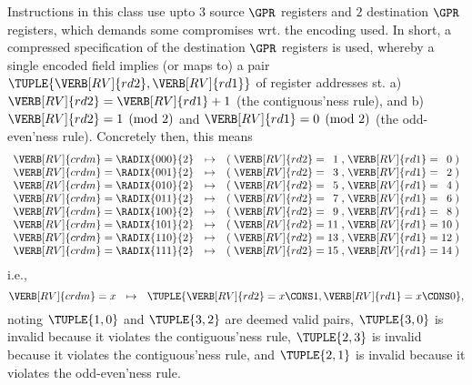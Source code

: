 Instructions in this class use upto
$3$ source      $\GPR$ registers
and
$2$ destination $\GPR$ registers,
which demands some compromises wrt. the encoding used.
In short, a compressed specification of the destination $\GPR$ registers is
used, whereby a single encoded  field implies (or maps to) a 
pair 
$
\TUPLE{ \VERB[RV]{rd2}, \VERB[RV]{rd1} }
$
of register addresses st.
a) $\VERB[RV]{rd2} = \VERB[RV]{rd1} + 1$
   (the contiguous'ness rule),
   and
b) $\VERB[RV]{rd2} = 1 \pmod{2}$
   and 
   $\VERB[RV]{rd1} = 0 \pmod{2}$
   (the  odd-even'ness rule).
Concretely then, this means
\[
\begin{array}{l@{\;}c@{\;}r c c@{\;}l@{\;}c@{\;}r@{\;}c@{\;}l@{\;}c@{\;}r@{\;}c}
\VERB[RV]{crdm} &=& \RADIX{000}{2} &\mapsto& ( & \VERB[RV]{rd2} &=&  1 &,& \VERB[RV]{rd1} &=&  0 & ) \\
\VERB[RV]{crdm} &=& \RADIX{001}{2} &\mapsto& ( & \VERB[RV]{rd2} &=&  3 &,& \VERB[RV]{rd1} &=&  2 & ) \\
\VERB[RV]{crdm} &=& \RADIX{010}{2} &\mapsto& ( & \VERB[RV]{rd2} &=&  5 &,& \VERB[RV]{rd1} &=&  4 & ) \\
\VERB[RV]{crdm} &=& \RADIX{011}{2} &\mapsto& ( & \VERB[RV]{rd2} &=&  7 &,& \VERB[RV]{rd1} &=&  6 & ) \\
\VERB[RV]{crdm} &=& \RADIX{100}{2} &\mapsto& ( & \VERB[RV]{rd2} &=&  9 &,& \VERB[RV]{rd1} &=&  8 & ) \\
\VERB[RV]{crdm} &=& \RADIX{101}{2} &\mapsto& ( & \VERB[RV]{rd2} &=& 11 &,& \VERB[RV]{rd1} &=& 10 & ) \\
\VERB[RV]{crdm} &=& \RADIX{110}{2} &\mapsto& ( & \VERB[RV]{rd2} &=& 13 &,& \VERB[RV]{rd1} &=& 12 & ) \\
\VERB[RV]{crdm} &=& \RADIX{111}{2} &\mapsto& ( & \VERB[RV]{rd2} &=& 15 &,& \VERB[RV]{rd1} &=& 14 & ) \\
\end{array}
\]
i.e.,
\[
\VERB[RV]{crdm} = x ~~\mapsto~~ \TUPLE{ \VERB[RV]{rd2} = x \CONS 1 , \VERB[RV]{rd1} = x \CONS 0 } ,
\]
noting
$\TUPLE{ 1, 0 }$ and $\TUPLE{ 3, 2 }$ are deemed valid pairs,
$\TUPLE{ 3, 0 }$ is invalid because it violates the contiguous'ness rule,
$\TUPLE{ 2, 3 }$ is invalid because it violates the contiguous'ness rule,
and
$\TUPLE{ 2, 1 }$ is invalid because it violates the  odd-even'ness rule.



